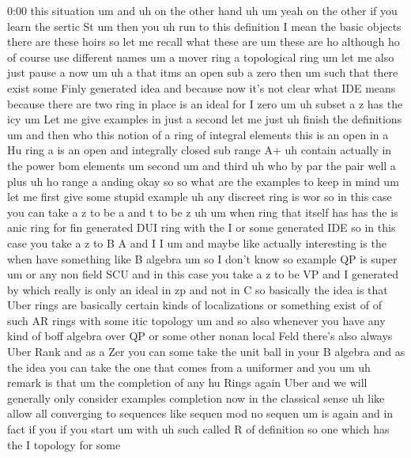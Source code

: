 \begin{unfinished}{0:00}
this
situation
um
and  uh  on  the  other
hand
uh
um  yeah  on  the  other  if  you  learn  the
sertic  St  um
then  you  uh  run  to  this  definition  I
mean  the  basic  objects  there  are  these
hoirs  so  let  me  recall  what  these  are  um
these
are  ho  although  ho  of  course  use
different  names
um  a  mover
ring  a  topological
ring
um  let  me  also  just  pause  a  now
um  uh  a  that  itms  an  open
sub  a  zero  then
um  such  that  there  exist  some  Finly
generated
idea  and  because  now  it's  not  clear  what
IDE  means  because  there  are  two  ring  in
place  is  an  ideal  for  I
zero
um  uh  subset  a  z  has  the
icy
um  Let  me  give  examples  in  just  a  second
let  me  just  uh  finish  the
definitions
um  and  then  who  this  notion  of  a  ring  of
integral
elements
this  is  an
open  in  a  Hu  ring
a  is  an
open  and  integrally  closed  sub
range
A+  uh  contain  actually  in  the  power  bom
elements
um  second
um
and
third  uh  who  by  par
the  pair
well  a  plus
uh  ho
range
a
anding
okay  so  so  what  are  the  examples  to  keep
in  mind
um  let  me  first  give  some  stupid  example
uh  any  discreet
ring  is  wor
so  in  this  case  you  can  take  a  z  to  be  a
and  t  to  be
z
uh
um  when  ring  that  itself  has  has  the  is
anic  ring  for  fin  generated
DUI  ring
with  the
I  or
some  generated
IDE  so  in  this  case  you  take  a  z  to  B  A
and  I
I  um
and
maybe  like  actually  interesting  is  the
when  have  something  like  B
algebra  um  so  I  don't  know  so  example  QP
is
super  um  or  any  non  field  SCU  and  in
this  case  you  take  a  z  to  be
VP  and  I  generated  by  which  really  is
only  an  ideal  in  zp  and  not  in
C  so
basically  the  idea  is  that  Uber  rings
are  basically  certain  kinds  of
localizations  or  something  exist  of  of
such  AR  rings  with  some  itic
topology
um  and  so  also  whenever  you  have  any
kind  of  boff  algebra  over  QP  or  some
other  nonan  local  Feld  there's  also
always  Uber  Rank  and  as  a  Zer  you  can
some  take  the  unit  ball  in  your  B
algebra  and  as  the  idea  you  can  take  the
one  that  comes  from  a  uniformer  and
you
um
uh  remark  is  that  um  the  completion  of
any  hu  Rings  again
Uber
and  we  will  generally  only  consider
examples  completion  now  in  the  classical
sense  uh  like  allow  all  converging  to
sequences  like  sequen  mod  no
sequen
um  is
again
and  in  fact  if
you  if  you
start
um  with  uh  such  called  R  of  definition
so  one  which  has  the  I  topology  for  some

\end{unfinished}
